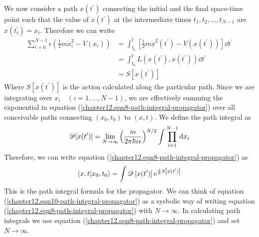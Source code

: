 	We now consider a path $x(t^\prime)$ connecting the initial and the final space-time point such that the value of $x(t^\prime)$ at the intermediate times $t_1, t_2, \ldots, t_{N-1}$ are $x(t_i^\prime)=x_i$. Therefore we can write
	\begin{align}
		\sum_{i=0}^{N-1} \epsilon \left(\frac{1}{2} m \dot{x}_i^2 - V(x_i)\right) 
		&= \int_{t_0}^{t} \left[\frac{1}{2} m \dot{x}^2(t^\prime) - V(x(t^\prime))\right] \dd{t^\prime} \\
		&= \int_{t_0}^{t} L\left(x(t^\prime), \dot{x}(t^\prime)\right) \dd{t^\prime} \\
		&= S[x(t^\prime)]
	\end{align}
	Where $S\left[x(t^\prime)\right]$ is the action calculated along the particular path. Since we are integrating over $x_i\quad (i=1,\ldots,N-1)$, we are effectively summing the exponential in equation (\ref{chapter12.eqn8-path-integral-propagator}) over all conceivable paths connecting $(x_0, t_0)$ to $(x, t)$. We define the path integral as
	\begin{equation}
		\mathcal{D}[x(t^\prime)] = \lim\limits_{N\rightarrow \infty} \left(\frac{m}{2 \pi \hbar {i\mkern1mu} \epsilon}\right)^{N/2} \int \prod_{i=1}^{N-1} \dd{x_i}
		\label{chapter12.eqn9-path-integral-propagator}
	\end{equation}
	Therefore, we can write equation (\ref{chapter12.eqn8-path-integral-propagator}) as
	\begin{equation}
		\braket{x, t}{x_0, t_0} = \int \mathcal{D}\left[x(t^\prime)\right] e^{\frac{i}{\hbar} S\left[x(t^\prime)\right]}
		\label{chapter12.eqn10-path-integral-propagator}
	\end{equation}
	This is the path integral formula for the propagator. We can think of equation (\ref{chapter12.eqn10-path-integral-propagator}) as a sysbolic way of writing equation (\ref{chapter12.eqn8-path-integral-propagator}) with $N \rightarrow \infty$. In calculating path integrals we use equation (\ref{chapter12.eqn8-path-integral-propagator}) and set $N \rightarrow \infty$.
	
